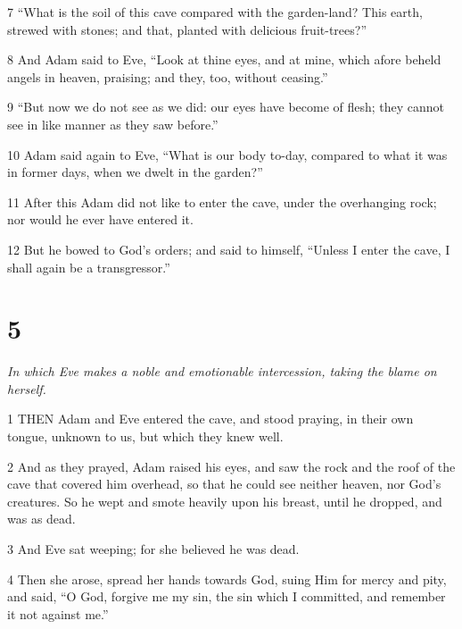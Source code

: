 \par 7 “What is the soil of this cave compared with the garden-land? This earth, strewed with stones; and that, planted with delicious fruit-trees?”

\par 8 And Adam said to Eve, “Look at thine eyes, and at mine, which afore beheld angels in heaven, praising; and they, too, without ceasing.”

\par 9 “But now we do not see as we did: our eyes have become of flesh; they cannot see in like manner as they saw before.”

\par 10 Adam said again to Eve, “What is our body to-day, compared to what it was in former days, when we dwelt in the garden?”

\par 11 After this Adam did not like to enter the cave, under the overhanging rock; nor would he ever have entered it.

\par 12 But he bowed to God's orders; and said to himself, “Unless I enter the cave, I shall again be a transgressor.”

\chapter{5}

\par \textit{In which Eve makes a noble and emotionable intercession, taking the blame on herself.}

\par 1 THEN Adam and Eve entered the cave, and stood praying, in their own tongue, unknown to us, but which they knew well.

\par 2 And as they prayed, Adam raised his eyes, and saw the rock and the roof of the cave that covered him overhead, so that he could see neither heaven, nor God's creatures. So he wept and smote heavily upon his breast, until he dropped, and was as dead.

\par 3 And Eve sat weeping; for she believed he was dead.

\par 4 Then she arose, spread her hands towards God, suing Him for mercy and pity, and said, “O God, forgive me my sin, the sin which I committed, and remember it not against me.”

